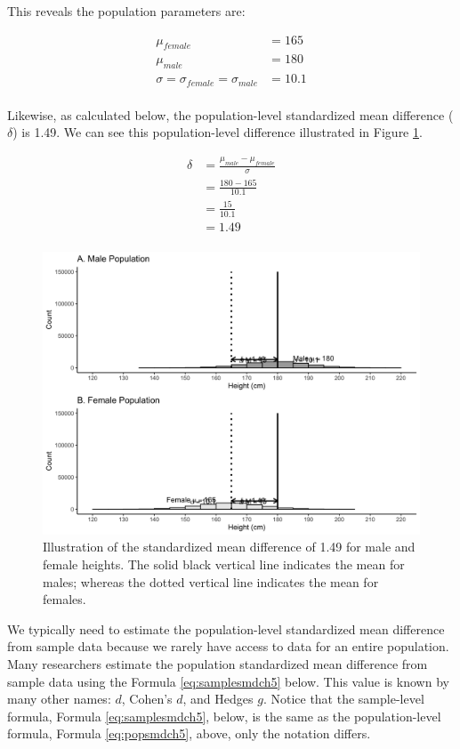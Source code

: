 \documentclass[
]{krantz}
\begin{document}
This reveals the population parameters are:

\[
\begin{aligned} 
\mu_{female} &= 165 \\
\mu_{male} &= 180 \\
\sigma = \sigma_{female} = \sigma_{male} &= 10.1\\
\end{aligned} 
\]

Likewise, as calculated below, the population-level standardized mean difference (\(\delta\)) is 1.49. We can see this population-level difference illustrated in Figure \ref{fig:sexpop}.

\[
\begin{aligned} 
\delta  &= \frac{\mu_{male} - \mu_{female}}{\sigma} \\
&= \frac{180 - 165}{10.1} \\
&= \frac{15}{10.1} \\
&= 1.49 \\
\end{aligned} 
\]

\begin{figure}
\includegraphics[width=0.95\linewidth]{ch_samples/images/sex_pops} \caption[Illustration of standardized mean difference of $\delta =1.49$]{Illustration of the standardized mean difference of 1.49 for male and female heights. The solid black vertical line indicates the mean for males; whereas the dotted vertical line indicates the mean for females.}\label{fig:sexpop}
\end{figure}

We typically need to estimate the population-level standardized mean difference from sample data because we rarely have access to data for an entire population. Many researchers estimate the population standardized mean difference from sample data using the Formula \eqref{eq:samplesmdch5} below. This value is known by many other names: \(d\), Cohen's \(d\), and Hedges \(g\). Notice that the sample-level formula, Formula \eqref{eq:samplesmdch5}, below, is the same as the population-level formula, Formula \eqref{eq:popsmdch5}, above, only the notation differs.
\end{document}
